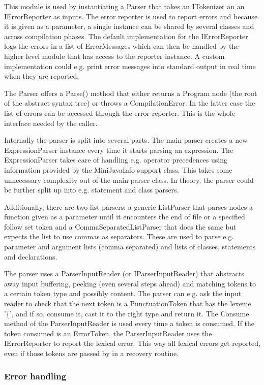 \documentclass[a4paper,11pt]{article}
\begin{document}
This module is used by instantiating a Parser that takes an ITokenizer an an IErrorReporter as inputs. The error reporter is used to report errors and because it is given as a parameter, a single instance can be shared by several classes and across compilation phases. The default implementation for the IErrorReporter logs the errors in a list of ErrorMessages which can then be handled by the higher level module that has access to the reporter instance. A custom implementation could e.g. print error messages into standard output in real time when they are reported.

The Parser offers a Parse() method that either returns a Program node (the root of the abstract syntax tree) or throws a CompilationError. In the latter case the list of errors can be accessed through the error reporter. This is the whole interface needed by the caller.

Internally the parser is split into several parts. The main parser creates a new ExpressionParser instance every time it starts parsing an expression. The ExpressionParser takes care of handling e.g. operator precedences using information provided by the MiniJavaInfo support class. This takes some unnecessary complexity out of the main parser class. In theory, the parser could be further split up into e.g. statement and class parsers.

Additionally, there are two list parsers: a generic ListParser that parses nodes a function given as a parameter until it encounters the end of file or a specified follow set token and a CommaSeparatedListParser that does the same but expects the list to use commas as separators. These are used to parse e.g. parameter and argument lists (comma separated) and lists of classes, statements and declarations.

The parser uses a ParserInputReader (or IParserInputReader) that abstracts away input buffering, peeking (even several steps ahead) and matching tokens to a certain token type and possibly content. The parser can e.g. ask the input reader to check that the next token is a PunctuationToken that has the lexeme '\{', and if so, consume it, cast it to the right type and return it. The Consume method of the ParserInputReader is used every time a token is consumed. If the token consumed is an ErrorToken, the ParserInputReader uses the IErrorReporter to report the lexical error. This way all lexical errors get reported, even if those tokens are passed by in a recovery routine.

\subsubsection{Error handling}
\end{document}
